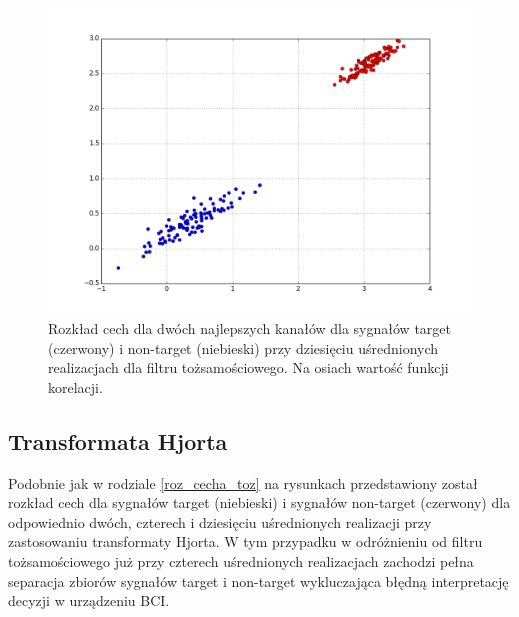 \documentclass[licencjacka,openright]{pracamgr}
\begin{document}
\begin{figure}
\centering
\includegraphics[scale=0.55, trim=10mm 15mm 10mm 18mm, clip=True]{pics/cecha_toz_10.png}
\caption{Rozkład cech dla dwóch najlepszych kanałów dla sygnałów target (czerwony) i non-target (niebieski) przy dziesięciu uśrednionych realizacjach dla filtru tożsamościowego. Na osiach wartość funkcji korelacji.}
\label{cecha_toz_10}
\end{figure}

\subsection{Transformata Hjorta}
\label{roz_cecha_hjorth}
Podobnie jak w rodziale \ref{roz_cecha_toz} na rysunkach przedstawiony został rozkład cech dla sygnałów target (niebieski) i sygnałów non-target (czerwony) dla odpowiednio dwóch, czterech i dziesięciu uśrednionych realizacji przy zastosowaniu transformaty Hjorta. W tym przypadku w odróżnieniu od filtru tożsamościowego już przy czterech uśrednionych realizacjach zachodzi pełna separacja zbiorów sygnałów target i non-target wykluczająca błędną interpretację decyzji w urządzeniu BCI.
\end{document}
